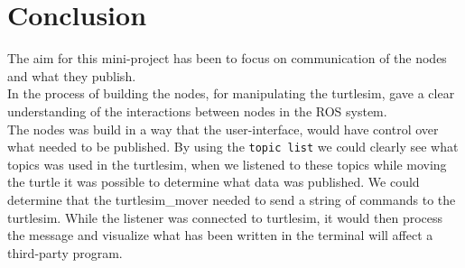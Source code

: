 \chapter{Conclusion}\label{ch:conclusion}


The aim for this mini-project has been to focus on communication of the nodes and what they publish.\\ In the process of building the nodes, for manipulating the turtlesim, gave a clear understanding of the interactions between nodes in the ROS system.\\
The nodes was build in a way that the user-interface, would have control over what needed to be published. By using the \texttt{topic list} we could clearly see what topics was used in the turtlesim, when we listened to these topics while moving the turtle it was possible to determine what data was published. We could determine that the turtlesim\_mover needed to send a string of commands to the turtlesim. While the listener was connected to turtlesim, it would then process the message and visualize what has been written in the terminal will affect a third-party program.\\
